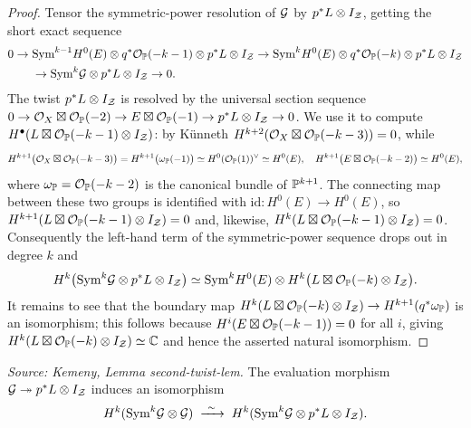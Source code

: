 \begin{proof}
  Tensor the symmetric-power resolution of \(\mathcal{G}\) by \(p^*L\otimes I_{\mathcal{Z}}\),
  getting the short exact sequence
  \begin{align*}
    0\to{}&\mathrm{Sym}^{k-1}H^0(E)\otimes q^*\mathcal{O}_{\mathbb{P}}(-k-1)\otimes p^*L\otimes I_{\mathcal{Z}}
      \to\mathrm{Sym}^kH^0(E)\otimes q^*\mathcal{O}_{\mathbb{P}}(-k)\otimes p^*L\otimes I_{\mathcal{Z}}\\
      &\to\mathrm{Sym}^k\mathcal{G}\otimes p^*L\otimes I_{\mathcal{Z}}\to0 .
  \end{align*}
  The twist \(p^*L\otimes I_{\mathcal{Z}}\) is resolved by the universal section sequence
  \(0\to\mathcal{O}_X\boxtimes\mathcal{O}_{\mathbb{P}}(-2)\to E\boxtimes\mathcal{O}_{\mathbb{P}}(-1)\to
   p^*L\otimes I_{\mathcal{Z}}\to0\).  We use it to compute
  \(H^\bullet(L\boxtimes\mathcal{O}_{\mathbb{P}}(-k-1)\otimes I_{\mathcal{Z}})\): by Künneth
  \(H^{k+2}(\mathcal{O}_X\boxtimes\mathcal{O}_{\mathbb{P}}(-k-3))=0\), while
  \[
    H^{k+1}\bigl(\mathcal{O}_X\boxtimes\mathcal{O}_{\mathbb{P}}(-k-3)\bigr)
      =H^{k+1}\bigl(\omega_{\mathbb{P}}(-1)\bigr)\simeq H^0(\mathcal{O}_{\mathbb{P}}(1))^\vee\simeq H^0(E),
    \quad
    H^{k+1}\bigl(E\boxtimes\mathcal{O}_{\mathbb{P}}(-k-2)\bigr)\simeq H^0(E),
  \]
  where \(\omega_{\mathbb{P}}=\mathcal{O}_{\mathbb{P}}(-k-2)\) is the canonical bundle of
  \(\mathbb{P}^{k+1}\).  The connecting map between these two groups is identified with
  \(\mathrm{id}:H^0(E)\to H^0(E)\), so
  \(H^{k+1}(L\boxtimes\mathcal{O}_{\mathbb{P}}(-k-1)\otimes I_{\mathcal{Z}})=0\) and, likewise,
  \(H^k(L\boxtimes\mathcal{O}_{\mathbb{P}}(-k-1)\otimes I_{\mathcal{Z}})=0\).  Consequently the left-hand
  term of the symmetric-power sequence drops out in degree \(k\) and
  \[
    H^k\bigl(\mathrm{Sym}^k\mathcal{G}\otimes p^*L\otimes I_{\mathcal{Z}}\bigr)\simeq
    \mathrm{Sym}^kH^0(E)\otimes H^k\bigl(L\boxtimes\mathcal{O}_{\mathbb{P}}(-k)\otimes I_{\mathcal{Z}}\bigr).
  \]
  It remains to see that the boundary map
  \(H^k(L\boxtimes\mathcal{O}_{\mathbb{P}}(-k)\otimes I_{\mathcal{Z}})\to H^{k+1}(q^*\omega_{\mathbb{P}})\) is an
  isomorphism; this follows because \(H^i(E\boxtimes\mathcal{O}_{\mathbb{P}}(-k-1))=0\) for all
  \(i\), giving \(H^k(L\boxtimes\mathcal{O}_{\mathbb{P}}(-k)\otimes I_{\mathcal{Z}})\simeq\mathbb{C}\) and hence
  the asserted natural isomorphism.
\end{proof}

\begin{lemma}
  \label{lem:kemeny_second_twist}
  \textit{Source: Kemeny, Lemma second-twist-lem.}
  The evaluation morphism \(\mathcal{G}\twoheadrightarrow p^*L\otimes I_{\mathcal{Z}}\) induces an
  isomorphism
  \[
    H^k(\Sym^k\cG\otimes\cG)\;\xrightarrow{\ \sim\ }\;
    H^k(\Sym^k\cG\otimes p^*L\otimes I_{\cZ}).
  \]
\end{lemma}

